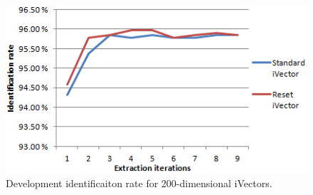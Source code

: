 \begin{figure}[hbt]
	\begin{center}
	\includegraphics{figures/resetidentification.png}
	\caption{Development identificaiton rate for 200-dimensional iVectors.}
	\label{fig:resetidrate}
	\end{center}
\end{figure}













